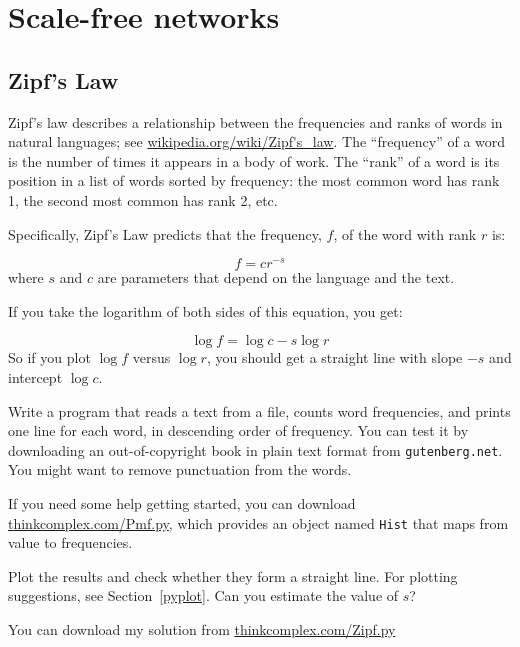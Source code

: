 \documentclass[10pt]{book}
\begin{document}
\chapter{Scale-free networks}

\section{Zipf's Law}

Zipf's law describes a relationship between the frequencies and ranks
of words in natural languages; see
  \url{wikipedia.org/wiki/Zipf's_law}.  The ``frequency'' of
a word is the number of times it appears in a body of work.
The ``rank'' of a word is its position in a list of words
sorted by frequency: the most common word has rank 1, the
second most common has rank 2, etc.

Specifically, Zipf's Law
predicts that the frequency, $f$, of the word with rank $r$ is:

\[ f = c r^{-s} \]
%
where $s$ and $c$ are parameters that depend on the language and the
text.

If you take the logarithm of both sides of this equation, you get:


\[ \log f = \log c - s \log r \]
%
So if you plot $\log f$ versus $\log r$, you should get
a straight line with slope $-s$ and intercept $\log c$.

\begin{ex}

Write a program that reads a text from a file, counts word
frequencies, and prints one line for each word, in descending order of
frequency.  You can test it by downloading an out-of-copyright book in
plain text format from {\tt gutenberg.net}.  You might want to remove
punctuation from the words.

If you need some help getting started, you can download
\url{thinkcomplex.com/Pmf.py}, which provides an
object named {\tt Hist} that maps from value to frequencies.

Plot the results and check whether they form
a straight line.  For plotting suggestions, see Section~\ref{pyplot}.
Can you estimate the value of $s$?

You can download my solution from
\url{thinkcomplex.com/Zipf.py}

\end{ex}
\end{document}
